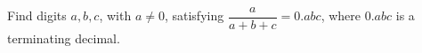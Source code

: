 Find digits $a,b,c$, with $a\ne0$, satisfying $\dfrac{a}{a+b+c}=0.abc$, where $0.abc$ is a terminating decimal.
